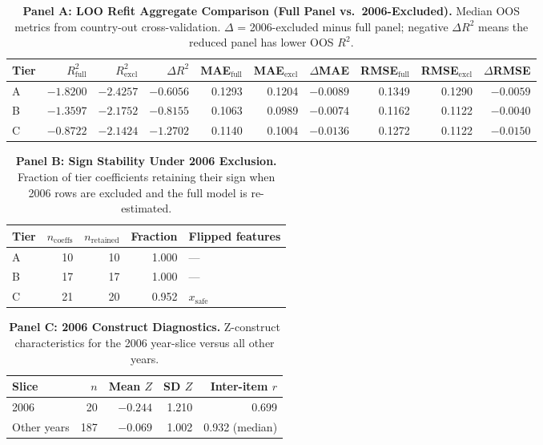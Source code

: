 \documentclass[11pt]{article}
\newcommand{\TableStyle}{%
    \small
    \setlength{\tabcolsep}{2pt}%
    \renewcommand{\arraystretch}{0.9}%
}
\begin{document}
\setcounter{table}{13}%
\begin{table}[!htbp]
\centering
\TableStyle
\caption{\textbf{Panel A: LOO Refit Aggregate Comparison (Full Panel vs.\ 2006-Excluded).} Median OOS metrics from country-out cross-validation. $\Delta$ = 2006-excluded minus full panel; negative $\Delta R^2$ means the reduced panel has lower OOS $R^2$.}
\label{tab:2006-loo-comparison}
\begin{tabular}{l r r r r r r r r r}
\hline
\textbf{Tier} & \textbf{$R^2_{\text{full}}$} & \textbf{$R^2_{\text{excl}}$} & \textbf{$\Delta R^2$} & \textbf{MAE$_{\text{full}}$} & \textbf{MAE$_{\text{excl}}$} & \textbf{$\Delta$MAE} & \textbf{RMSE$_{\text{full}}$} & \textbf{RMSE$_{\text{excl}}$} & \textbf{$\Delta$RMSE} \\
\hline
A & $-1.8200$ & $-2.4257$ & $-0.6056$ & 0.1293 & 0.1204 & $-0.0089$ & 0.1349 & 0.1290 & $-0.0059$ \\
B & $-1.3597$ & $-2.1752$ & $-0.8155$ & 0.1063 & 0.0989 & $-0.0074$ & 0.1162 & 0.1122 & $-0.0040$ \\
C & $-0.8722$ & $-2.1424$ & $-1.2702$ & 0.1140 & 0.1004 & $-0.0136$ & 0.1272 & 0.1122 & $-0.0150$ \\
\hline
\end{tabular}
\end{table}

\begin{table}[!htbp]
\centering
\TableStyle
\caption*{\textbf{Panel B: Sign Stability Under 2006 Exclusion.} Fraction of tier coefficients retaining their sign when 2006 rows are excluded and the full model is re-estimated.}
\begin{tabular}{l r r r l}
\hline
\textbf{Tier} & \textbf{$n_{\text{coeffs}}$} & \textbf{$n_{\text{retained}}$} & \textbf{Fraction} & \textbf{Flipped features} \\
\hline
A & 10 & 10 & 1.000 & --- \\
B & 17 & 17 & 1.000 & --- \\
C & 21 & 20 & 0.952 & $x_{\text{safe}}$ \\
\hline
\end{tabular}
\end{table}

\begin{table}[!htbp]
\centering
\TableStyle
\caption*{\textbf{Panel C: 2006 Construct Diagnostics.} Z-construct characteristics for the 2006 year-slice versus all other years.}
\begin{tabular}{l r r r r}
\hline
\textbf{Slice} & \textbf{$n$} & \textbf{Mean $Z$} & \textbf{SD $Z$} & \textbf{Inter-item $r$} \\
\hline
2006 & 20 & $-0.244$ & 1.210 & 0.699 \\
Other years & 187 & $-0.069$ & 1.002 & 0.932 (median) \\
\hline
\end{tabular}
\end{table}
\end{document}
